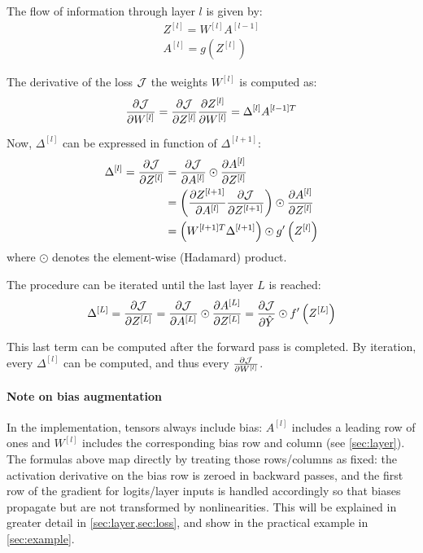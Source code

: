 The flow of information through layer $l$ is given by:
\begin{gather*}
    Z^{[l]} = W^{[l]} A^{[l-1]}\\
    A^{[l]} = g\left(Z^{[l]}\right)
\end{gather*}

The derivative of the loss $\mathcal{J}$ \wrt the weights $W^{[l]}$ is computed as:
\begin{equation*}
    \pdv{\mathcal{J}}{W^{[l]}} = \pdv{\mathcal{J}}{Z^{[l]}} \pdv{Z^{[l]}}{W^{[l]}} = \Delta^{[l]} A^{[l-1]T}
\end{equation*}

Now, $\Delta^{[l]}$ can be expressed in function of $\Delta^{[l + 1]}$:
\begin{align*}
    \Delta^{[l]} = \pdv{\mathcal{J}}{Z^{[l]}} &= \pdv{\mathcal{J}}{A^{[l]}} \odot \pdv{A^{[l]}}{Z^{[l]}}\\
    &= \left(\pdv{Z^{[l+1]}}{A^{[l]}} \pdv{\mathcal{J}}{Z^{[l+1]}} \right) \odot \pdv{A^{[l]}}{Z^{[l]}}\\
    &= \left(W^{[l+1]T} \Delta^{[l+1]} \right) \odot g'\left(Z^{[l]}\right)
\end{align*}
where $\odot$ denotes the element-wise (Hadamard) product.

The procedure can be iterated until the last layer $L$ is reached:
\begin{align*}
    \Delta^{[L]} = \pdv{\mathcal{J}}{Z^{[L]}} = \pdv{\mathcal{J}}{A^{[L]}} \odot \pdv{A^{[L]}}{Z^{[L]}} = \pdv{\mathcal{J}}{\hat{Y}} \odot f'\left(Z^{[L]}\right)
\end{align*}

This last term can be computed after the forward pass is completed. By iteration, every $\Delta^{[l]}$ can be computed, and thus every $\pdv{\mathcal{J}}{W^{[l]}}$.

\paragraph{Note on bias augmentation} In the implementation, tensors always include bias: $A^{[l]}$ includes a leading row of ones and $W^{[l]}$ includes the corresponding bias row and column (see \cref{sec:layer}). The formulas above map directly by treating those rows/columns as fixed: the activation derivative on the bias row is zeroed in backward passes, and the first row of the gradient for logits/layer inputs is handled accordingly so that biases propagate but are not transformed by nonlinearities. This will be explained in greater detail in \cref{sec:layer,sec:loss}, and show in the practical example in \cref{sec:example}.
